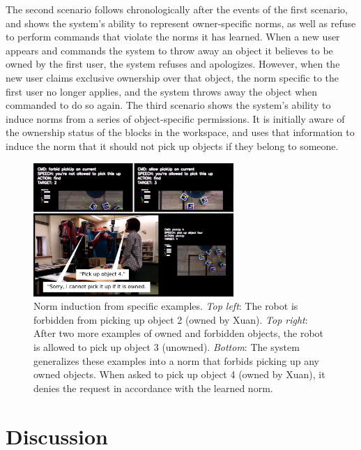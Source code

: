 \documentclass[letterpaper]{article} %
\begin{document}
The second scenario follows chronologically after the events of the first scenario, and shows the system's ability to represent owner-specific norms, as well as refuse to perform commands that violate the norms it has learned. When a new user appears and commands the system to throw away an object it believes to be owned by the first user, the system refuses and apologizes. However, when the new user claims exclusive ownership over that object, the norm specific to the first user no longer applies, and the system throws away the object when commanded to do so again.  The third scenario shows the system's ability to induce norms from a series of object-specific permissions. It is initially aware of the ownership status of the blocks in the workspace, and uses that information to induce the norm that it should not pick up objects if they belong to someone.

\begin{figure}[t]
\centering
\includegraphics[width=0.9\linewidth,height=1.99in ]{demo_2.pdf}
\caption{Norm induction from specific examples. \emph{Top left}: The robot is forbidden from picking up object 2 (owned by Xuan). \emph{Top right}: After two more examples of owned and forbidden objects, the robot is allowed to pick up object 3 (unowned). \emph{Bottom}: The system generalizes these examples into a norm that forbids picking up any owned objects. When asked to pick up object 4 (owned by Xuan), it denies the request in accordance with the learned norm.}
\label{fig:demo_2}
\end{figure}

\vspace{-0.95mm}
\vspace{-1.73mm}
\section{Discussion}
\end{document}
